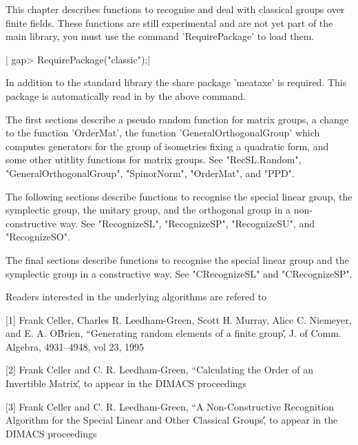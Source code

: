 
This  chapter describes functions   to recognise and deal with  classical
groups over finite fields.   These functions  are still experimental  and
are not yet  part of the main  {\GAP} library, you  must use  the command
'RequirePackage' to load them.

|    gap> RequirePackage("classic");|

In addition to the standard {\GAP} library the share package 'meataxe' is
required.  This package is automatically read in by the above command.

The first sections describe a pseudo random function for matrix groups, a
change to the function  'OrderMat', the function 'GeneralOrthogonalGroup'
which computes generators for the group  of isometries fixing a quadratic
form, and some     other utitlity functions  for   matrix  groups.    See
"RecSL.Random",  "GeneralOrthogonalGroup", "SpinorNorm", "OrderMat",  and
"PPD".

The following sections describe functions to recognise the special linear
group, the symplectic group, the  unitary group, and the orthogonal group
in    a   non-constructive   way.    See  "RecognizeSL",   "RecognizeSP",
"RecognizeSU", and "RecognizeSO".

The   final sections describe  functions to  recognise the special linear
group and the symplectic group in a constructive way.  See "CRecognizeSL"
and "CRecognizeSP".

Readers interested in the underlying algorithms are refered to

[1]
  Frank Celler,  Charles  R.    Leedham-Green, Scott H.    Murray,  Alice
  C.  Niemeyer,  and E.  A.  O\'Brien, ``Generating  random elements of a
  finite group\'\', J. of Comm. Algebra, 4931--4948, vol 23, 1995

[2]
  Frank Celler  and C. R.   Leedham-Green, ``Calculating the  Order of an
  Invertible Matrix\'\', to appear in the DIMACS proceedings


[3]
  Frank Celler and C.  R. Leedham-Green, ``A Non-Constructive Recognition
  Algorithm  for the  Special  Linear and  Other Classical Groups\'\', to
  appear in the DIMACS proceedings


